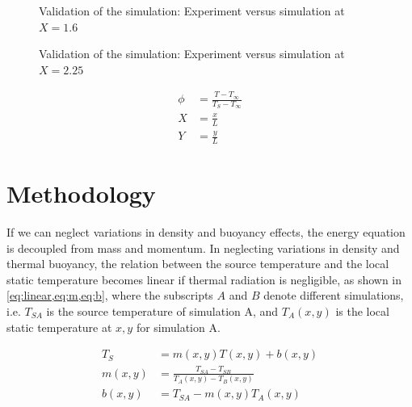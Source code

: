 \documentclass[preprint,12pt]{elsarticle}
\begin{document}
\begin{figure}[!htbp]
	\centering
  \setlength\figureheight{6cm} 
	\setlength\figurewidth{6cm}
	
	\caption{Validation of the simulation: Experiment versus simulation at $X=1.6$}
	\label{fig:simVSexpX40}
\end{figure}
\begin{figure}[!htbp]
	\centering
	\setlength\figureheight{6cm} 
	\setlength\figurewidth{6cm}
	
	\caption{Validation of the simulation: Experiment versus simulation at $X=2.25$}
	\label{fig:simVSexpX70}
\end{figure}

\begin{subequations}
\label{eq:normalize}
\begin{align}
\phi &= \frac{T-T_{\infty}}{T_S-T_{\infty}} \\
X &= \frac{x}{L} \\
Y &= \frac{y}{L} 
\end{align}
\end{subequations}




\section{Methodology}
If we can neglect variations in density and buoyancy effects, the energy equation is decoupled from mass and momentum.  In neglecting variations in density and thermal buoyancy, the relation between the source temperature and the local static temperature becomes linear if thermal radiation is negligible, as shown in \cref{eq:linear,eq:m,eq:b}, where the subscripts $A$ and $B$ denote different simulations,  i.e. $T_{SA}$ is the source temperature of simulation A, and $T_A\left( x,y \right)$ is the local static temperature at $x,y$ for simulation A.

\begin{subequations}
\label{eq:linearset}
\begin{align}
T_S &= m\left( x,y \right) T\left( x,y \right) + b\left( x,y \right) \label{eq:linear} \\
m\left( x,y \right) &= \frac{T_{SA} - T_{SB}}{T_A \left( x,y \right) - T_B\left( x,y \right)} \label{eq:m} \\
b\left( x,y \right) &= T_{SA} - m\left( x,y \right) T_A \left( x,y \right) \label{eq:b}
\end{align}
\end{subequations}
\end{document}
